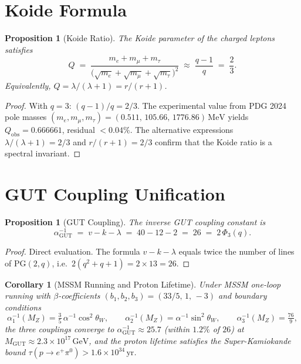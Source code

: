 \documentclass[12pt,a4paper]{article}
\newtheorem{proposition}[theorem]{Proposition}
\newtheorem{corollary}[theorem]{Corollary}
\newcommand{\alphaGUT}{\alpha_{\!\mathrm{GUT}}}
\newcommand{\MGUT}{M_{\!\mathrm{GUT}}}
\begin{document}
\section{Koide Formula}
\label{sec:koide}

\begin{proposition}[Koide Ratio]\label{prop:koide}
The Koide parameter of the charged leptons satisfies
\[
  Q \;=\;
  \frac{m_e+m_\mu+m_\tau}
       {\bigl(\!\sqrt{m_e}+\sqrt{m_\mu}+\sqrt{m_\tau}\bigr)^{\!2}}
  \;\approx\;\frac{q-1}{q}\;=\;\frac{2}{3}.
\]
Equivalently, $Q=\lambda/(\lambda+1)=r/(r+1)$.
\end{proposition}

\begin{proof}
With $q=3$: $(q-1)/q = 2/3$.  The experimental value from PDG 2024
pole masses $(m_e,m_\mu,m_\tau)=(0.511,\,105.66,\,1776.86)\,\mathrm{MeV}$
yields $Q_{\mathrm{obs}}=0.666661$, residual $<0.04\%$.
The alternative expressions $\lambda/(\lambda+1) = 2/3$ and
$r/(r+1) = 2/3$ confirm that the Koide ratio is a spectral invariant.
\end{proof}

\section{GUT Coupling Unification}
\label{sec:gut}

\begin{proposition}[GUT Coupling]\label{prop:gut}
The inverse GUT coupling constant is
\[
  \alphaGUT^{-1}\;=\; v-k-\lambda
  \;=\;40-12-2\;=\;26\;=\;2\,\Phi_3(q).
\]
\end{proposition}

\begin{proof}
Direct evaluation.  The formula $v-k-\lambda$ equals twice the number
of lines of $\mathrm{PG}(2,q)$, i.e.\ $2(q^2+q+1)=2\times 13=26$.
\end{proof}

\begin{corollary}[MSSM Running and Proton Lifetime]\label{cor:proton}
Under MSSM one-loop running with $\beta$-coefficients
$(b_1,b_2,b_3)=(33/5,\,1,\,-3)$ and boundary conditions
\[
  \alpha_1^{-1}(M_Z)=\tfrac{3}{5}\,\alpha^{-1}\cos^2\!\theta_W,
  \qquad
  \alpha_2^{-1}(M_Z)=\alpha^{-1}\sin^2\!\theta_W,
  \qquad
  \alpha_3^{-1}(M_Z)=\tfrac{76}{9},
\]
the three couplings converge to $\alphaGUT^{-1}\approx 25.7$
(within $1.2\%$ of $26$) at
$\MGUT\approx 2.3\times 10^{17}\,\mathrm{GeV}$,
and the proton lifetime satisfies the Super-Kamiokande bound
$\tau(p\to e^+\pi^0)>1.6\times 10^{34}\,\mathrm{yr}$.
\end{corollary}
\end{document}
